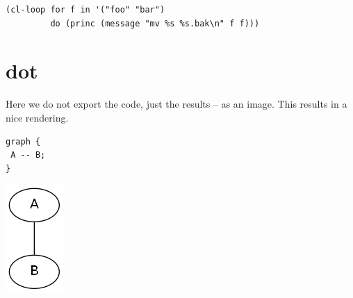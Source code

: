 \documentclass[11pt]{article}
\begin{document}
\begin{verbatim}
(cl-loop for f in '("foo" "bar")
         do (princ (message "mv %s %s.bak\n" f f)))
\end{verbatim}

\section{dot}
\label{sec:org1eb5fd0}

Here we do not export the code, just the results -- as an image.  This results in a nice rendering.

\begin{verbatim}
graph {
 A -- B;
}
\end{verbatim}

\begin{center}
\includegraphics[width=.9\linewidth]{dotResult.png}
\end{center}
\end{document}
